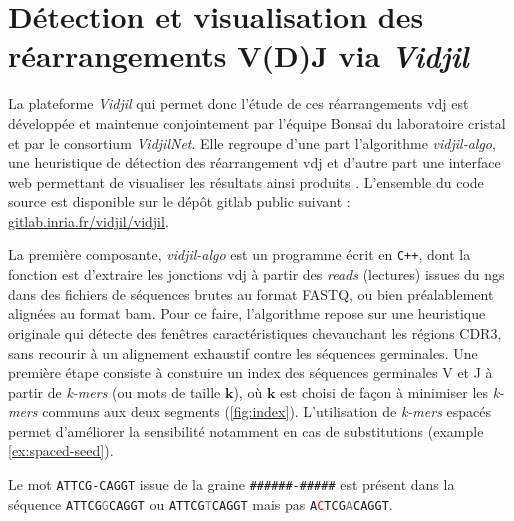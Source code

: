 \section{Détection et visualisation des réarrangements V(D)J via \textit{Vidjil}}


La plateforme \textit{Vidjil} qui permet donc l'étude de ces réarrangements
\gls{vdj} est développée et maintenue conjointement par l'équipe Bonsai du
laboratoire \gls{cristal} et par le consortium \textit{VidjilNet}. Elle
regroupe d'une part l'algorithme \textit{vidjil-algo}, une heuristique de
détection des réarrangement \gls{vdj}
\cite{giraudFastMulticlonalClusterization2014b} et d'autre part une interface
web permettant de visualiser les résultats ainsi produits
\cite{duezVidjilWebPlatform2016}. L'ensemble du code source est disponible sur
le dépôt gitlab public suivant :
\href{https://gitlab.inria.fr/vidjil/vidjil}{gitlab.inria.fr/vidjil/vidjil}.

\vspace{1em}

La première composante, \textit{vidjil-algo} est un programme écrit en
\texttt{C++}, dont la fonction est d'extraire les jonctions \gls{vdj} à partir
des \textit{reads} (lectures) issues du \gls{ngs} dans des fichiers de
séquences brutes au format FASTQ, ou bien préalablement alignées au format
\gls{bam}. Pour ce faire, l'algorithme repose sur une heuristique originale qui
détecte des fenêtres caractéristiques chevauchant les régions CDR3, sans
recourir à un alignement exhaustif contre les séquences germinales. Une
première étape consiste à constuire un index des séquences germinales V et J à
partir de \textit{k-mers} (ou mots de taille $\mathbf{k}$), où $\mathbf{k}$ est
choisi de façon à minimiser les \textit{k-mers} communs aux deux segments
(\autoref{fig:index}). L'utilisation de \textit{k-mers} espacés permet
d'améliorer la sensibilité notamment en cas de substitutions (example
\ref{ex:spaced-seed}).

\begin{examplebox}[label={ex:spaced-seed}]
    Le mot \texttt{ATTCG-CAGGT} issue de la graine \texttt{\#\#\#\#\#\#-\#\#\#\#\#}
    est présent dans la séquence \texttt{ATTCG\textcolor{gray}{G}CAGGT} ou \texttt{ATTCG\textcolor{gray}{T}CAGGT}
    mais pas \texttt{A\textcolor{red}{C}TCG\textcolor{gray}{A}CAGGT}.
\end{examplebox}

